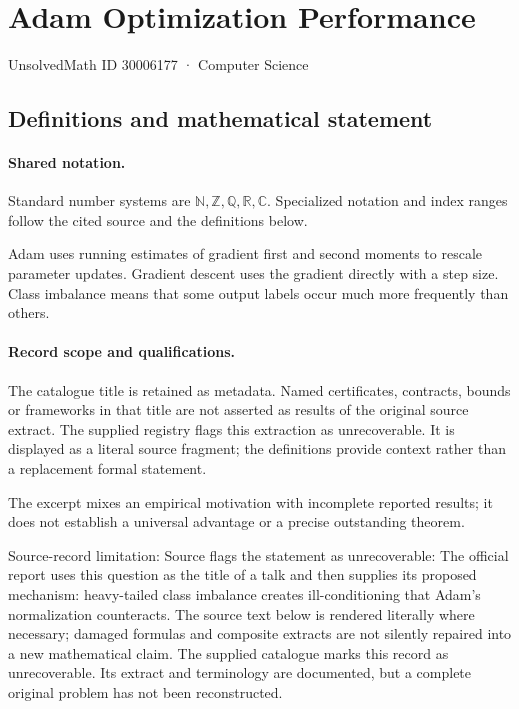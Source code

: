 \documentclass[11pt]{article}
\begin{document}
\setcounter{section}{30006176}
\section{Adam Optimization Performance}\label{30006177}
{\small\sffamily UnsolvedMath ID 30006177 · Computer Science}
\subsection{Definitions and mathematical statement}

\paragraph{Shared notation.}Standard number systems are $\mathbb N,\mathbb Z,\mathbb Q,\mathbb R,\mathbb C$. Specialized notation and index ranges follow the cited source and the definitions below.


Adam uses running estimates of gradient first and second moments to rescale parameter updates. Gradient descent uses the gradient directly with a step size. Class imbalance means that some output labels occur much more frequently than others.
\paragraph{Record scope and qualifications.}
The catalogue title is retained as metadata. Named certificates, contracts, bounds or frameworks in that title are not asserted as results of the original source extract.
The supplied registry flags this extraction as unrecoverable. It is displayed as a literal source fragment; the definitions provide context rather than a replacement formal statement.

The excerpt mixes an empirical motivation with incomplete reported results; it does not establish a universal advantage or a precise outstanding theorem.

Source-record limitation: Source flags the statement as unrecoverable: The official report uses this question as the title of a talk and then supplies its proposed mechanism: heavy-tailed class imbalance creates ill-conditioning that Adam’s normalization counteracts.
The source text below is rendered literally where necessary; damaged formulas and composite extracts are not silently repaired into a new mathematical claim.
The supplied catalogue marks this record as unrecoverable. Its extract and terminology are documented, but a complete original problem has not been reconstructed.
\end{document}
